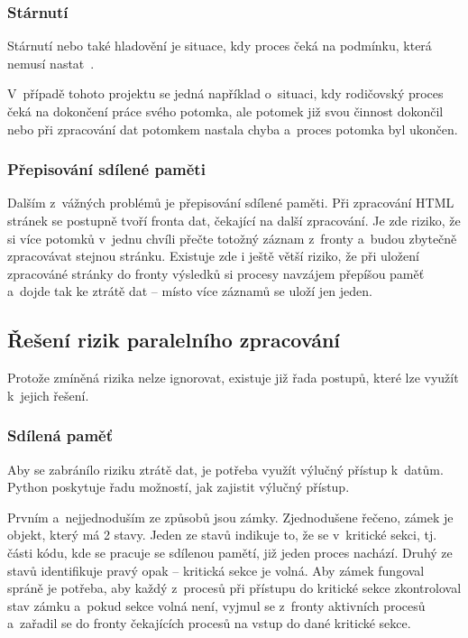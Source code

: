 \subsubsection{Stárnutí}
Stárnutí nebo také hladovění je situace, kdy proces čeká na podmínku, která nemusí nastat~\cite{SYNCPROCES}.

V~případě tohoto projektu se jedná například o~situaci, kdy rodičovský proces čeká na dokončení práce svého
potomka, ale potomek již svou činnost dokončil nebo při zpracování dat potomkem nastala chyba a~proces potomka
byl ukončen.

\subsubsection{Přepisování sdílené paměti}
Dalším z~vážných problémů je přepisování sdílené paměti. Při zpracování HTML stránek se postupně tvoří
fronta dat, čekající na další zpracování. Je zde riziko, že si více potomků v~jednu chvíli přečte totožný
záznam z~fronty a~budou zbytečně zpracovávat stejnou stránku. Existuje zde i ještě větší riziko,
že při uložení zpracováné stránky do fronty výsledků si procesy navzájem přepíšou paměť a~dojde tak
ke ztrátě dat -- místo více záznamů se uloží jen jeden.

\subsection{Řešení rizik paralelního zpracování}
\label{paralel_hazards}
Protože zmíněná rizika nelze ignorovat, existuje již řada postupů, které lze využít k~jejich řešení.

\subsubsection{Sdílená paměť}
Aby se zabránílo riziku ztrátě dat, je potřeba využít výlučný přístup k~datům. Python
poskytuje řadu možností, jak zajistit výlučný přístup.

Prvním a~nejjednoduším ze způsobů jsou zámky. Zjednodušene řečeno, zámek je objekt, který má 2 stavy.
Jeden ze stavů indikuje to, že se v~kritické sekci, tj. části kódu, kde se pracuje se sdílenou pamětí,
již jeden proces nachází. Druhý ze stavů identifikuje pravý opak -- kritická sekce je volná. Aby zámek
fungoval spráně je potřeba, aby každý z~procesů při přístupu do kritické sekce zkontroloval stav
zámku a~pokud sekce volná není, vyjmul se z~fronty aktivních procesů a~zařadil se do fronty čekajících
procesů na vstup do dané kritické sekce.

